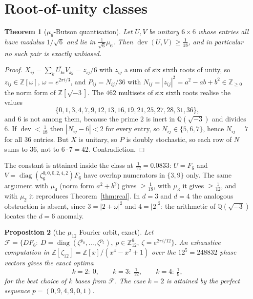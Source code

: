 \documentclass[11pt,a4paper]{article}
\newtheorem{theorem}{Theorem}[section]
\newtheorem{proposition}[theorem]{Proposition}
\theoremstyle{remark}
\newcommand{\dev}{\operatorname{dev}}
\begin{document}
\section{Root-of-unity classes}
\label{sec:butson}

\begin{theorem}[$\mu_6$-Butson quantisation]\label{thm:butson}
Let $U,V$ be unitary $6\times6$ whose entries all have modulus $1/\sqrt6$ and lie in
$\tfrac1{\sqrt6}\mu_6$.  Then $\dev(U,V)\ge\tfrac1{18}$, and in particular no such pair is
exactly unbiased.
\end{theorem}
\begin{proof}
$X_{ij}=\sum_k\overline{U_{ki}}V_{kj}=z_{ij}/6$ with $z_{ij}$ a sum of six sixth roots of
unity, so $z_{ij}\in\mathbb Z[\omega]$, $\omega=e^{2\pi i/3}$, and
$P_{ij}=N_{ij}/36$ with $N_{ij}=|z_{ij}|^2=a^2-ab+b^2\in\mathbb Z_{\ge0}$ the norm form of
$\mathbb Z[\sqrt{-3}]$.  The $462$ multisets of six sixth roots realise the values
\[
\{0,1,3,4,7,9,12,13,16,19,21,25,27,28,31,36\},
\]
and $6$ is not among them, because the prime $2$ is inert in $\mathbb Q(\sqrt{-3})$ and
divides $6$.  If $\dev<\tfrac1{18}$ then $|N_{ij}-6|<2$ for every entry, so
$N_{ij}\in\{5,6,7\}$, hence $N_{ij}=7$ for all $36$ entries.  But $X$ is unitary, so $P$ is
doubly stochastic, so each row of $N$ sums to $36$, not to $6\cdot7=42$.  Contradiction.
\end{proof}

The constant is attained inside the class at $\tfrac1{12}=0.0833$: $U=F_6$ and
$V=\operatorname{diag}(\zeta_6^{0,0,0,2,4,2})F_6$ have overlap numerators in $\{3,9\}$ only.
The same argument with $\mu_4$ (norm form $a^2+b^2$) gives $\ge\tfrac1{18}$, with $\mu_3$ it
gives $\ge\tfrac1{12}$, and with $\mu_2$ it reproduces Theorem~\ref{thm:real}.  In $d=3$ and
$d=4$ the analogous obstruction is absent, since $3=|2+\omega|^2$ and $4=|2|^2$: the
arithmetic of $\mathbb Q(\sqrt{-3})$ locates the $d=6$ anomaly.

\begin{proposition}[the $\mu_{12}$ Fourier orbit, exact]\label{prop:fourier}
Let $\mathcal F=\{DF_6:\ D=\operatorname{diag}(\zeta^{p_0},\dots,\zeta^{p_5}),\ p\in\mathbb
Z_{12}^6,\ \zeta=e^{2\pi i/12}\}$.  An exhaustive computation in
$\mathbb Z[\zeta_{12}]=\mathbb Z[x]/(x^4-x^2+1)$ over the $12^5=248832$ phase vectors gives
the exact optima
\[
k=2:\ 0,\qquad k=3:\ \tfrac1{12},\qquad k=4:\ \tfrac19 ,
\]
for the best choice of $k$ bases from $\mathcal F$.  The case $k=2$ is attained by the perfect
sequence $p=(0,9,4,9,0,1)$.
\end{proposition}
\end{document}
